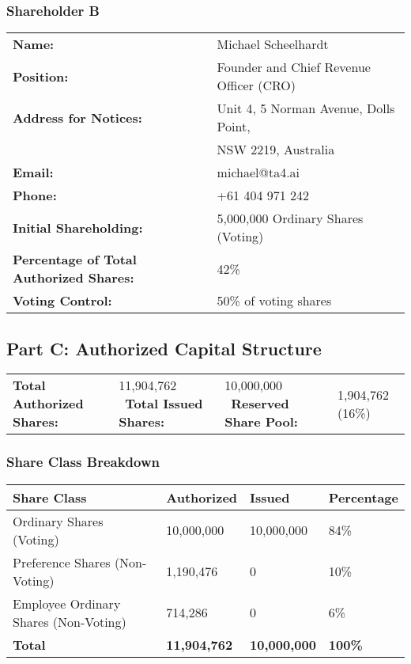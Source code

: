 \vspace{1em}

\subsubsection*{Shareholder B}
\begin{tabularx}{\textwidth}{@{} l X @{}}
\textbf{Name:} & Michael Scheelhardt \\
\textbf{Position:} & Founder and Chief Revenue Officer (CRO) \\
\textbf{Address for Notices:} & Unit 4, 5 Norman Avenue, Dolls Point, \\
& NSW 2219, Australia \\
\textbf{Email:} & michael@ta4.ai \\
\textbf{Phone:} & +61 404 971 242 \\
\textbf{Initial Shareholding:} & 5,000,000 Ordinary Shares (Voting) \\
\textbf{Percentage of Total Authorized Shares:} & 42\% \\
\textbf{Voting Control:} & 50\% of voting shares
\end{tabularx}

\vspace{1em}

\subsection*{Part C: Authorized Capital Structure}
\begin{tabularx}{\textwidth}{@{} l X @{}}
\textbf{Total Authorized Shares:} & 11,904,762 \
\textbf{Total Issued Shares:} & 10,000,000 \
\textbf{Reserved Share Pool:} & 1,904,762 (16\%)
\end{tabularx}

\vspace{1em}

\subsubsection*{Share Class Breakdown}
\begin{tabularx}{\textwidth}{@{} l l l l @{}}
\textbf{Share Class} & \textbf{Authorized} & \textbf{Issued} & \textbf{Percentage} \\
\hline
Ordinary Shares (Voting) & 10,000,000 & 10,000,000 & 84\% \\
Preference Shares (Non-Voting) & 1,190,476 & 0 & 10\% \\
Employee Ordinary Shares (Non-Voting) & 714,286 & 0 & 6\% \\
\hline
\textbf{Total} & \textbf{11,904,762} & \textbf{10,000,000} & \textbf{100\%} \\
\end{tabularx}

